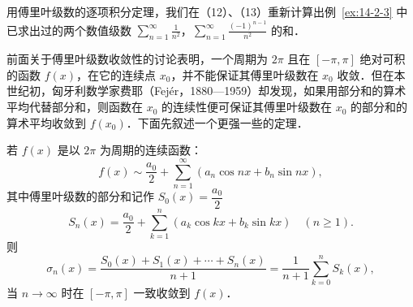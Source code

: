 用傅里叶级数的逐项积分定理，我们在（12）、（13）重新计算出例~\ref{ex:14-2-3} 中已求出过的两个数值级数 $\displaystyle\sum_{n=1}^{\infty}\frac{1}{n^{2}}$，$\displaystyle\sum_{n=1}^{\infty}\frac{(-1)^{n-1}}{n^{2}}$ 的和．

前面关于傅里叶级数收敛性的讨论表明，一个周期为 $2\pi$ 且在 $[-\pi,\pi]$ 绝对可积的函数 $f(x)$，在它的连续点 $x_{0}$，并不能保证其傅里叶级数在 $x_{0}$ 收敛．但在本世纪初，匈牙利数学家费耶（Fej\'er，1880---1959）却发现，如果用部分和的算术平均代替部分和，则函数在 $x_{0}$ 的连续性便可保证其傅里叶级数在 $x_{0}$ 的部分和的算术平均收敛到 $f(x_{0})$．下面先叙述一个更强一些的定理．

\begin{theorem}[费耶]\label{thm:14-7}
若 $f(x)$ 是以 $2\pi$ 为周期的连续函数：
\[
f(x)\sim\frac{a_{0}}{2}+\sum_{n=1}^{\infty}\left(a_{n}\cos nx+b_{n}\sin nx\right),
\]
其中傅里叶级数的部分和记作 $S_{0}(x)=\dfrac{a_{0}}{2}$
\[
S_{n}(x)=\frac{a_{0}}{2}+\sum_{k=1}^{n}\left(a_{k}\cos kx+b_{k}\sin kx\right)\quad(n\geqslant 1).
\]
则
\[
\sigma_{n}(x)=\frac{S_{0}(x)+S_{1}(x)+\cdots+S_{n}(x)}{n+1}=\frac{1}{n+1}\sum_{k=0}^{n}S_{k}(x),
\]
当 $n\to\infty$ 时在 $[-\pi,\pi]$ 一致收敛到 $f(x)$．
\end{theorem}

